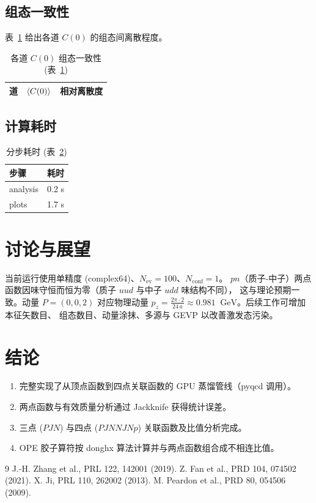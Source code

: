 \documentclass[11pt,a4paper]{article}
\newcommand{\gev}{\;\mathrm{GeV}}
\newcommand{\Nconf}{N_{\mathrm{conf}}}
\newcommand{\Nev}{N_{\mathrm{ev}}}
\begin{document}
\subsection{组态一致性}
表~\ref{tab:config} 给出各道 $C(0)$ 的组态间离散程度。
\begin{table}[h]
\centering
\caption{各道 $C(0)$ 组态一致性 (表~\ref{tab:config})}
\label{tab:config}
\begin{tabular}{lcc}
\toprule
道 & $\braket{C(0)}$ & 相对离散度 \\
\midrule

\bottomrule
\end{tabular}
\end{table}

\subsection{计算耗时}
\begin{table}[h]
\centering
\caption{分步耗时 (表~\ref{tab:timing})}
\label{tab:timing}
\begin{tabular}{lr}
\toprule
步骤 & 耗时 \\
\midrule
    analysis & 0.2 s \\
    plots & 1.7 s \\
\bottomrule
\end{tabular}
\end{table}

\section{讨论与展望}
当前运行使用单精度 (complex64)、$\Nev=100$、$\Nconf=1$。
$pn$（质子-中子）两点函数因味守恒而恒为零（质子 $uud$ 与中子 $udd$ 味结构不同），
这与理论预期一致。动量 $P=(0,0,2)$ 对应物理动量
$p_z = \frac{2\pi\cdot 2}{24\,a}\approx 0.981\;\gev$。后续工作可增加本征矢数目、
组态数目、动量涂抹、多源与 GEVP 以改善激发态污染。

\section{结论}
\begin{enumerate}
    \item 完整实现了从顶点函数到四点关联函数的 GPU 蒸馏管线（pyqcd 调用）。
    \item 两点函数与有效质量分析通过 Jackknife 获得统计误差。
    \item 三点 ($PJN$) 与四点 ($PJNNJNp$) 关联函数及比值分析完成。
    \item OPE 胶子算符按 donghx 算法计算并与两点函数组合成不相连比值。
\end{enumerate}

\begin{thebibliography}{9}
 J.-H. Zhang et al., PRL 122, 142001 (2019).
 Z. Fan et al., PRD 104, 074502 (2021).
 X. Ji, PRL 110, 262002 (2013).
 M. Peardon et al., PRD 80, 054506 (2009).
\end{thebibliography}
\end{document}
